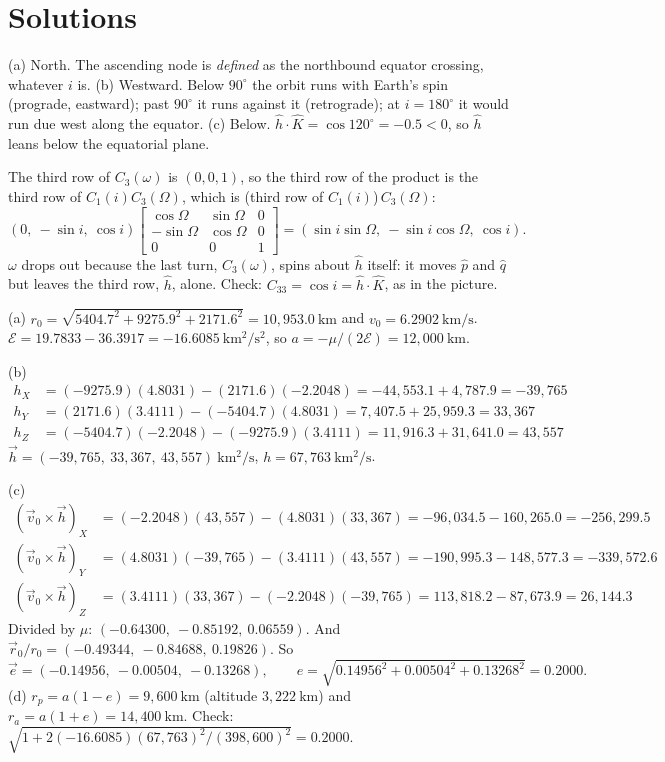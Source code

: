 \documentclass[11pt]{article}
\newcommand{\km}{\ \mathrm{km}}
\newcommand{\kms}{\ \mathrm{km/s}}
\begin{document}
\clearpage
\section*{Solutions}\label{solutions}

(a) North. The ascending node is \emph{defined} as the northbound equator crossing, whatever $i$ is.
(b) Westward. Below $90^\circ$ the orbit runs with Earth's spin (prograde, eastward); past $90^\circ$ it runs
against it (retrograde); at $i = 180^\circ$ it would run due west along the equator.
(c) Below. $\hat h\cdot\hat K = \cos 120^\circ = -0.5 < 0$, so $\hat h$ leans below the equatorial plane.

The third row of $C_3(\omega)$ is $(0,0,1)$, so the third row of the product is the third row of
$C_1(i)C_3(\Omega)$, which is (third row of $C_1(i)$)$\,C_3(\Omega)$:
\[
(0,\ -\sin i,\ \cos i)\begin{bmatrix}\cos\Omega&\sin\Omega&0\\-\sin\Omega&\cos\Omega&0\\0&0&1\end{bmatrix}
= (\sin i\sin\Omega,\ -\sin i\cos\Omega,\ \cos i).
\]
$\omega$ drops out because the last turn, $C_3(\omega)$, spins about $\hat h$ itself: it moves $\hat p$ and
$\hat q$ but leaves the third row, $\hat h$, alone. Check: $C_{33} = \cos i = \hat h\cdot\hat K$, as in the picture.

(a) $r_0 = \sqrt{5404.7^2 + 9275.9^2 + 2171.6^2} = 10{,}953.0\km$ and $v_0 = 6.2902\kms$.
$\mathcal E = 19.7833 - 36.3917 = -16.6085\ \mathrm{km^2/s^2}$, so $a = -\mu/(2\mathcal E) = 12{,}000\km$.

(b) \begin{align*}
h_X &= (-9275.9)(4.8031) - (2171.6)(-2.2048) = -44{,}553.1 + 4{,}787.9 = -39{,}765\\
h_Y &= (2171.6)(3.4111) - (-5404.7)(4.8031) = 7{,}407.5 + 25{,}959.3 = 33{,}367\\
h_Z &= (-5404.7)(-2.2048) - (-9275.9)(3.4111) = 11{,}916.3 + 31{,}641.0 = 43{,}557
\end{align*}
$\vec h = (-39{,}765,\ 33{,}367,\ 43{,}557)\ \mathrm{km^2/s}$, $h = 67{,}763\ \mathrm{km^2/s}$.

(c) \begin{align*}
(\vec v_0\times\vec h)_X &= (-2.2048)(43{,}557) - (4.8031)(33{,}367) = -96{,}034.5 - 160{,}265.0 = -256{,}299.5\\
(\vec v_0\times\vec h)_Y &= (4.8031)(-39{,}765) - (3.4111)(43{,}557) = -190{,}995.3 - 148{,}577.3 = -339{,}572.6\\
(\vec v_0\times\vec h)_Z &= (3.4111)(33{,}367) - (-2.2048)(-39{,}765) = 113{,}818.2 - 87{,}673.9 = 26{,}144.3
\end{align*}
Divided by $\mu$: $(-0.64300,\ -0.85192,\ 0.06559)$. And $\vec r_0/r_0 = (-0.49344,\ -0.84688,\ 0.19826)$. So
\[
\vec e = (-0.14956,\ -0.00504,\ -0.13268), \qquad e = \sqrt{0.14956^2 + 0.00504^2 + 0.13268^2} = 0.2000 .
\]
(d) $r_p = a(1-e) = 9{,}600\km$ (altitude $3{,}222\km$) and $r_a = a(1+e) = 14{,}400\km$.
Check: $\sqrt{1 + 2(-16.6085)(67{,}763)^2/(398{,}600)^2} = 0.2000$. \checkmark
\end{document}
